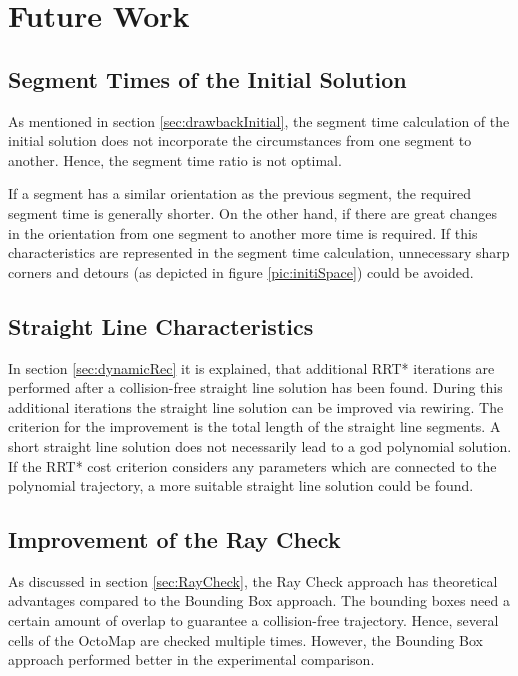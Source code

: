\chapter{Future Work}\label{chap:Future}

\section{Segment Times of the Initial Solution}
As mentioned in section  \ref{sec:drawbackInitial}, the segment time calculation of the initial solution does not incorporate the circumstances from one segment to another. Hence, the segment time ratio is not optimal. \newline

If a segment has a similar orientation as the previous segment, the required segment time is generally shorter. On the other hand, if there are great changes in the orientation from one segment to another more time is required. If this characteristics are represented in the segment time calculation, unnecessary sharp corners and detours (as depicted in figure \ref{pic:initiSpace}) could be avoided.

\section{Straight Line Characteristics}

In section \ref{sec:dynamicRec} it is explained, that additional RRT* iterations are performed after a collision-free straight line solution has been found. During this additional iterations the straight line solution can be improved via rewiring. The criterion for the improvement is the total length of the straight line segments. \newline
A short straight line solution does not necessarily lead to a god polynomial solution. If the RRT* cost criterion considers any parameters which are connected to the polynomial trajectory, a more suitable straight line solution could be found.

\section{Improvement of the Ray Check}\label{sec:furureRayCheck}

As discussed in section \ref{sec:RayCheck}, the Ray Check approach has theoretical advantages compared to the Bounding Box approach. The bounding boxes need a certain amount of overlap to guarantee a collision-free trajectory. Hence, several cells of the OctoMap are checked multiple times. However, the Bounding Box approach performed better in the experimental comparison. \newline

